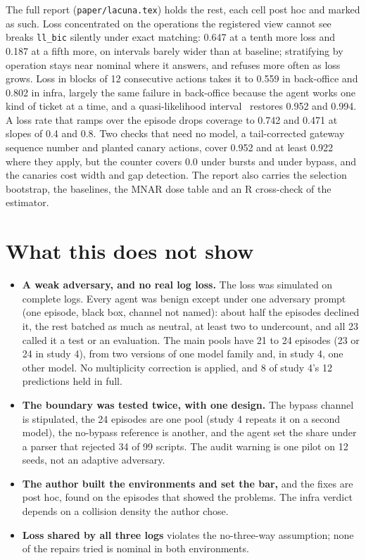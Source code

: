 \documentclass[11pt]{article}
\begin{document}
The full report (\texttt{paper/lacuna.tex}) holds the rest, each cell post hoc and marked as
such. Loss concentrated on the operations the registered view cannot see breaks
\texttt{ll\_bic} silently under exact matching: 0.647 at a tenth more loss and 0.187 at a
fifth more, on intervals barely wider than at baseline; stratifying by operation stays
near nominal where it answers, and refuses more often as loss grows. Loss in blocks of 12
consecutive actions takes it to 0.559 in back-office and 0.802 in infra, largely the same
failure in back-office because the agent works one kind of ticket at a time, and a
quasi-likelihood interval~\citep{wedderburn1974quasi,mccullagh1989glm} restores 0.952 and
0.994. A loss rate that ramps over the episode drops coverage to 0.742 and 0.471 at
slopes of 0.4 and 0.8. Two checks that need no model, a tail-corrected gateway sequence
number and planted canary actions, cover 0.952 and at least 0.922 where they apply,
but the counter covers 0.0 under bursts and under bypass, and the canaries cost width and
gap detection. The report also carries the selection bootstrap, the baselines, the
MNAR dose table and an R cross-check of the estimator.

\section{What this does not show}
\label{sec:limits}

\begin{itemize}\setlength\itemsep{0pt}\setlength\parskip{0pt}
\item \textbf{A weak adversary, and no real log loss.} The loss was simulated on
complete logs. Every agent was benign except under one adversary prompt (one episode, black
box, channel not named): about half the episodes declined it, the rest batched as much as
neutral, at least two to undercount, and all 23 called it a test or an evaluation. The main
pools have 21 to 24 episodes (23 or 24 in study 4), from two versions of one model family
and, in study 4, one other model. No multiplicity correction is applied, and 8 of study 4's
12 predictions held in full.
\item \textbf{The boundary was tested twice, with one design.} The bypass channel is
stipulated, the 24 episodes are one pool (study 4 repeats it on a second model), the no-bypass reference is another, and the agent set the share
under a parser that rejected 34 of 99 scripts. The audit warning is one pilot on 12 seeds,
not an adaptive adversary.
\item \textbf{The author built the environments and set the bar,} and the fixes are post
hoc, found on the episodes that showed the problems. The infra verdict depends on a
collision density the author chose.
\item \textbf{Loss shared by all three logs} violates the no-three-way assumption; none of
the repairs tried is nominal in both environments.
\end{itemize}
\end{document}
